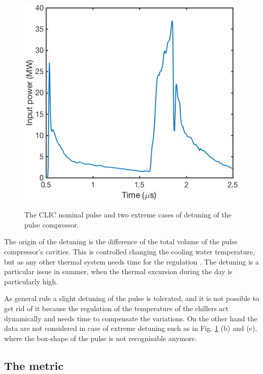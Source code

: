 \begin{figure}[h]
   {\includegraphics[scale=0.41]{pictures/Overtuning.png}}
\caption{The CLIC nominal pulse and two extreme cases of detuning of the pulse compressor.}
 \label{detuning_fig}
 \end{figure}


The origin of the detuning is the difference of the total volume of the pulse compressor's cavities. This is controlled changing the cooling water temperature, but as any other thermal system needs time for the regulation \cite{Woolley:CWS2016}. The detuning is a particular issue in summer, when the thermal excursion during the day is particularly high.

As general rule a slight detuning of the pulse is tolerated, and it is not possible to get rid of it because the regulation of the temperature of the chillers act dynamically and needs time to compensate the variations. On the other hand the data are not considered in case of extreme detuning such as in Fig. \ref{detuning_fig} (b) and (c), where the box-shape of the pulse is not recognisable anymore. 



\subsection[The metric]{The metric}

